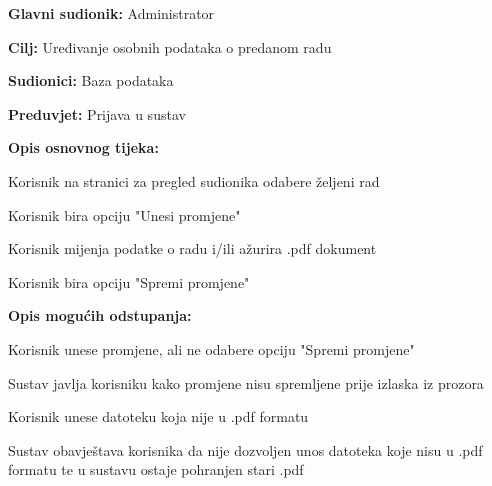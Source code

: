 					\noindent {}
					\begin{packed_item}
						\item \textbf{Glavni sudionik:} Administrator
						\item \textbf{Cilj:} Uređivanje osobnih podataka o predanom radu
						\item \textbf{Sudionici:} Baza podataka
						\item \textbf{Preduvjet:} Prijava u sustav
						
						\item \textbf{Opis osnovnog tijeka:} 
						\item[] \begin{packed_enum}
							\item Korisnik na stranici za pregled sudionika odabere željeni rad
							\item Korisnik bira opciju "Unesi promjene"
							\item Korisnik mijenja podatke o radu i/ili ažurira .pdf dokument
							\item Korisnik bira opciju "Spremi promjene"
						\end{packed_enum}
					
						\item \textbf{Opis mogućih odstupanja:}
						\item[] \begin{packed_enum}

							\item[3.a] Korisnik unese promjene, ali ne odabere opciju "Spremi promjene"
							\item[] \begin{packed_enum}
								\item[1.] Sustav javlja korisniku kako promjene nisu spremljene prije izlaska iz prozora
							\end{packed_enum}
							\item[3.b] Korisnik unese datoteku koja nije u .pdf formatu
							\item[] \begin{packed_enum}
								\item[1.] Sustav obavještava korisnika da nije dozvoljen unos datoteka koje nisu u .pdf formatu te u sustavu ostaje pohranjen stari .pdf
							\end{packed_enum}
						\end{packed_enum}
					\end{packed_item}

